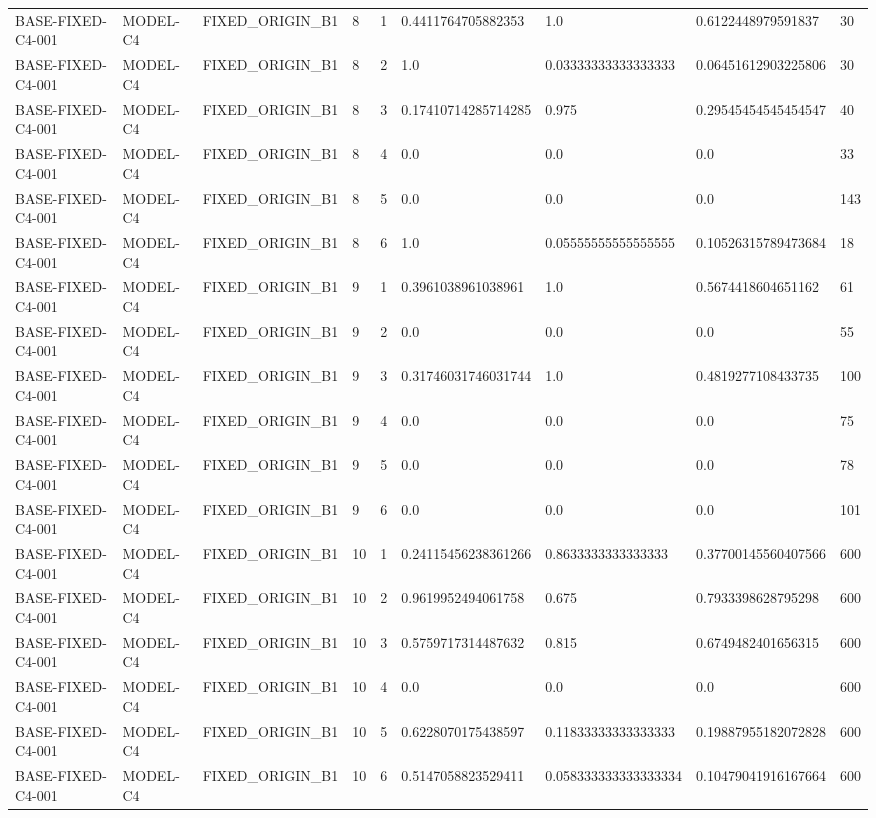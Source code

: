 \begin{tabular}{lllllllll}
BASE-FIXED-C4-001 & MODEL-C4 & FIXED\_ORIGIN\_B1 & 8 & 1 & 0.4411764705882353 & 1.0 & 0.6122448979591837 & 30 \\
BASE-FIXED-C4-001 & MODEL-C4 & FIXED\_ORIGIN\_B1 & 8 & 2 & 1.0 & 0.03333333333333333 & 0.06451612903225806 & 30 \\
BASE-FIXED-C4-001 & MODEL-C4 & FIXED\_ORIGIN\_B1 & 8 & 3 & 0.17410714285714285 & 0.975 & 0.29545454545454547 & 40 \\
BASE-FIXED-C4-001 & MODEL-C4 & FIXED\_ORIGIN\_B1 & 8 & 4 & 0.0 & 0.0 & 0.0 & 33 \\
BASE-FIXED-C4-001 & MODEL-C4 & FIXED\_ORIGIN\_B1 & 8 & 5 & 0.0 & 0.0 & 0.0 & 143 \\
BASE-FIXED-C4-001 & MODEL-C4 & FIXED\_ORIGIN\_B1 & 8 & 6 & 1.0 & 0.05555555555555555 & 0.10526315789473684 & 18 \\
BASE-FIXED-C4-001 & MODEL-C4 & FIXED\_ORIGIN\_B1 & 9 & 1 & 0.3961038961038961 & 1.0 & 0.5674418604651162 & 61 \\
BASE-FIXED-C4-001 & MODEL-C4 & FIXED\_ORIGIN\_B1 & 9 & 2 & 0.0 & 0.0 & 0.0 & 55 \\
BASE-FIXED-C4-001 & MODEL-C4 & FIXED\_ORIGIN\_B1 & 9 & 3 & 0.31746031746031744 & 1.0 & 0.4819277108433735 & 100 \\
BASE-FIXED-C4-001 & MODEL-C4 & FIXED\_ORIGIN\_B1 & 9 & 4 & 0.0 & 0.0 & 0.0 & 75 \\
BASE-FIXED-C4-001 & MODEL-C4 & FIXED\_ORIGIN\_B1 & 9 & 5 & 0.0 & 0.0 & 0.0 & 78 \\
BASE-FIXED-C4-001 & MODEL-C4 & FIXED\_ORIGIN\_B1 & 9 & 6 & 0.0 & 0.0 & 0.0 & 101 \\
BASE-FIXED-C4-001 & MODEL-C4 & FIXED\_ORIGIN\_B1 & 10 & 1 & 0.24115456238361266 & 0.8633333333333333 & 0.37700145560407566 & 600 \\
BASE-FIXED-C4-001 & MODEL-C4 & FIXED\_ORIGIN\_B1 & 10 & 2 & 0.9619952494061758 & 0.675 & 0.7933398628795298 & 600 \\
BASE-FIXED-C4-001 & MODEL-C4 & FIXED\_ORIGIN\_B1 & 10 & 3 & 0.5759717314487632 & 0.815 & 0.6749482401656315 & 600 \\
BASE-FIXED-C4-001 & MODEL-C4 & FIXED\_ORIGIN\_B1 & 10 & 4 & 0.0 & 0.0 & 0.0 & 600 \\
BASE-FIXED-C4-001 & MODEL-C4 & FIXED\_ORIGIN\_B1 & 10 & 5 & 0.6228070175438597 & 0.11833333333333333 & 0.19887955182072828 & 600 \\
BASE-FIXED-C4-001 & MODEL-C4 & FIXED\_ORIGIN\_B1 & 10 & 6 & 0.5147058823529411 & 0.058333333333333334 & 0.10479041916167664 & 600 \\
 \hline
\end{tabular}
